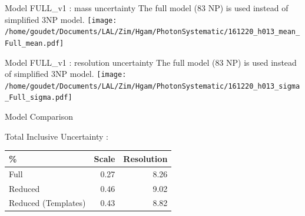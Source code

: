 \documentclass[a4paper]{beamer}
\begin{document}
\begin{frame}{Model FULL\_v1 : mass uncertainty}
  The full model (83 NP) is used instead of simplified 3NP model.
  \vfill
  \texttt{[image: /home/goudet/Documents/LAL/Zim/Hgam/PhotonSystematic/161220\_h013\_mean\_Full\_mean.pdf]}
  
\end{frame}
\begin{frame}{Model FULL\_v1 : resolution uncertainty}
  The full model (83 NP) is used instead of simplified 3NP model.
  \vfill
  \texttt{[image: /home/goudet/Documents/LAL/Zim/Hgam/PhotonSystematic/161220\_h013\_sigma\_Full\_sigma.pdf]}
\end{frame}

\begin{frame}{Model Comparison}
  \begin{center}
    Total Inclusive Uncertainty :\\
    \begin{tabular}{l|rr}
      \% & Scale & Resolution \\
      \hline
      Full & 0.27 & 8.26 \\
      Reduced & 0.46 & 9.02 \\
      Reduced (Templates) & 0.43 & 8.82\\
    \end{tabular}
  \end{center}
\end{frame}
\appendix

\end{document}
